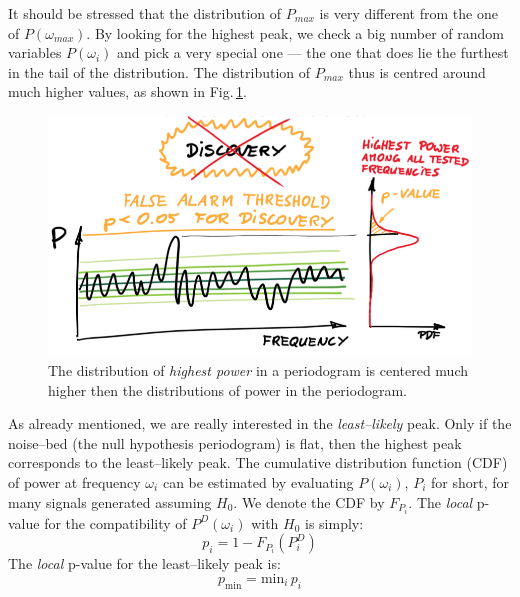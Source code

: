 It should be stressed that the distribution of $P_{max}$ is very different from the one of $P(\omega_{max})$. By looking for the highest peak, we check a big number of random variables $P(\omega_i)$ and pick a very special one --- the one that does lie the furthest in the tail of the distribution. The distribution of $P_{max}$ thus is centred around much higher values, as shown in Fig.\,\ref{fig:max_power_distribution}.

\begin{figure}[htb]
  \centering \includegraphics[width=\linewidth]{gfx/axions/max_power_distribution.png}
  \caption{The distribution of \emph{highest power} in a periodogram is centered much higher then the distributions of power in the periodogram.}
  \label{fig:max_power_distribution}
\end{figure}

 As already mentioned, we are really interested in the \emph{least--likely} peak. Only if the noise--bed (the null hypothesis periodogram) is flat, then the highest peak corresponds to the least--likely peak. The cumulative distribution function (CDF) of power at frequency $\omega_i$ can be estimated by evaluating $P(\omega_i)$, $P_i$ for short, for many signals generated assuming $H_0$. We denote the CDF by $F_{P_i}$. The \emph{local} p-value for the compatibility of $P^D(\omega_i)$ with $H_0$ is simply:
\begin{equation}
  p_i = 1 - F_{P_i}(P^D_i)
\end{equation}
The \emph{local} p-value for the least--likely peak is:
\begin{equation}
  p_{\mathrm{min}} = \mathrm{min}_i \, p_i
\end{equation}

